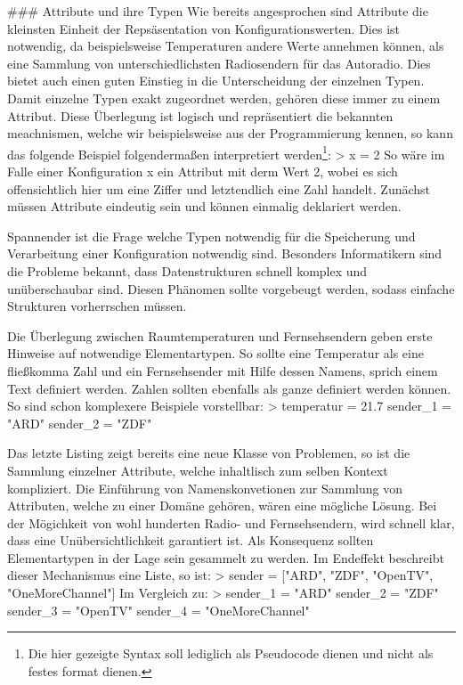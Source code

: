 ### Attribute und ihre Typen
Wie bereits angesprochen sind Attribute die kleinsten Einheit der Repsäsentation von Konfigurationswerten. Dies ist notwendig, da beispielsweise Temperaturen andere Werte annehmen können, als eine Sammlung von unterschiedlichsten Radiosendern für das Autoradio. Dies bietet auch einen guten Einstieg in die Unterscheidung der einzelnen Typen. Damit einzelne Typen exakt zugeordnet werden, gehören diese immer zu einem Attribut. Diese Überlegung ist logisch und repräsentiert die bekannten meachnismen, welche wir beispielsweise aus der Programmierung kennen, so kann das folgende Beispiel folgendermaßen interpretiert werden\footnote{Die hier gezeigte Syntax soll lediglich als Pseudocode dienen und nicht als festes format dienen.}:
>	x = 2
So wäre im Falle einer Konfiguration x ein Attribut mit derm Wert 2, wobei es sich offensichtlich hier um eine Ziffer und letztendlich eine Zahl handelt. Zunächst müssen Attribute eindeutig sein und können einmalig deklariert werden. 

Spannender ist die Frage welche Typen notwendig für die  Speicherung und Verarbeitung einer Konfiguration notwendig sind. Besonders Informatikern sind die Probleme bekannt, dass Datenstrukturen schnell komplex und unüberschaubar sind. Diesen Phänomen sollte vorgebeugt werden, sodass einfache Strukturen vorherrschen müssen. 

Die Überlegung zwischen Raumtemperaturen und Fernsehsendern geben erste Hinweise auf notwendige Elementartypen. So sollte eine Temperatur als eine fließkomma Zahl und ein Fernsehsender mit Hilfe dessen Namens, sprich einem Text definiert werden. Zahlen sollten ebenfalls als ganze definiert werden können. So sind schon komplexere Beispiele vorstellbar:
> temperatur = 21.7
	sender_1 = "ARD"
	sender_2 = "ZDF"

Das letzte Listing zeigt bereits eine neue Klasse von Problemen, so ist die Sammlung einzelner Attribute, welche inhaltlisch zum selben Kontext kompliziert. Die Einführung von Namenskonvetionen zur Sammlung von Attributen, welche zu einer Domäne gehören, wären eine mögliche Lösung. Bei der Mögichkeit von wohl hunderten Radio- und Fernsehsendern, wird schnell klar, dass eine Unübersichtlichkeit garantiert ist. 	Als Konsequenz sollten Elementartypen in der Lage sein gesammelt zu werden. Im Endeffekt beschreibt dieser Mechanismus eine Liste, so ist:
> sender = ["ARD", "ZDF", "OpenTV", "OneMoreChannel"]
Im Vergleich zu: 
> sender_1 = "ARD"
	sender_2 = "ZDF"
	sender_3 = "OpenTV"
	sender_4 = "OneMoreChannel"

